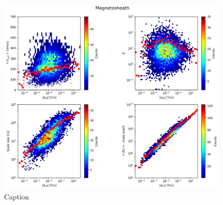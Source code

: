 \begin{figure}
    \centering
    \includegraphics[width=\textwidth]{Figures/GS analysis/heatmap_magnetosheath.png}
    \caption[2D distributions of various parameters vs. $|A_m|$ in the magnetosheath]{Caption}
    \label{fig:heatmap-magntosheath}
\end{figure}

